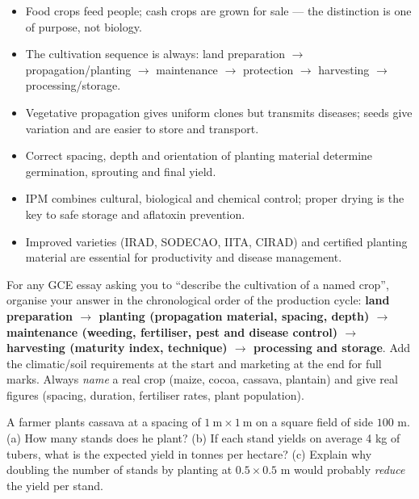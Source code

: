 \documentclass[11pt]{article}
\begin{document}
\begin{aretenir}
\begin{itemize}
\item Food crops feed people; cash crops are grown for sale — the distinction is one of purpose, not biology.
\item The cultivation sequence is always: land preparation $\rightarrow$ propagation/planting $\rightarrow$ maintenance $\rightarrow$ protection $\rightarrow$ harvesting $\rightarrow$ processing/storage.
\item Vegetative propagation gives uniform clones but transmits diseases; seeds give variation and are easier to store and transport.
\item Correct spacing, depth and orientation of planting material determine germination, sprouting and final yield.
\item IPM combines cultural, biological and chemical control; proper drying is the key to safe storage and aflatoxin prevention.
\item Improved varieties (IRAD, SODECAO, IITA, CIRAD) and certified planting material are essential for productivity and disease management.
\end{itemize}
\end{aretenir}

\begin{attention}
For any GCE essay asking you to ``describe the cultivation of a named crop'', organise your answer in the chronological order of the production cycle: \textbf{land preparation $\rightarrow$ planting (propagation material, spacing, depth) $\rightarrow$ maintenance (weeding, fertiliser, pest and disease control) $\rightarrow$ harvesting (maturity index, technique) $\rightarrow$ processing and storage}. Add the climatic/soil requirements at the start and marketing at the end for full marks. Always \emph{name} a real crop (maize, cocoa, cassava, plantain) and give real figures (spacing, duration, fertiliser rates, plant population).
\end{attention}

\begin{exercice}
A farmer plants cassava at a spacing of $1\ \mathrm{m} \times 1\ \mathrm{m}$ on a square field of side $100$ m. (a) How many stands does he plant? (b) If each stand yields on average 4 kg of tubers, what is the expected yield in tonnes per hectare? (c) Explain why doubling the number of stands by planting at $0.5 \times 0.5$ m would probably \emph{reduce} the yield per stand.
\end{exercice}
\end{document}

